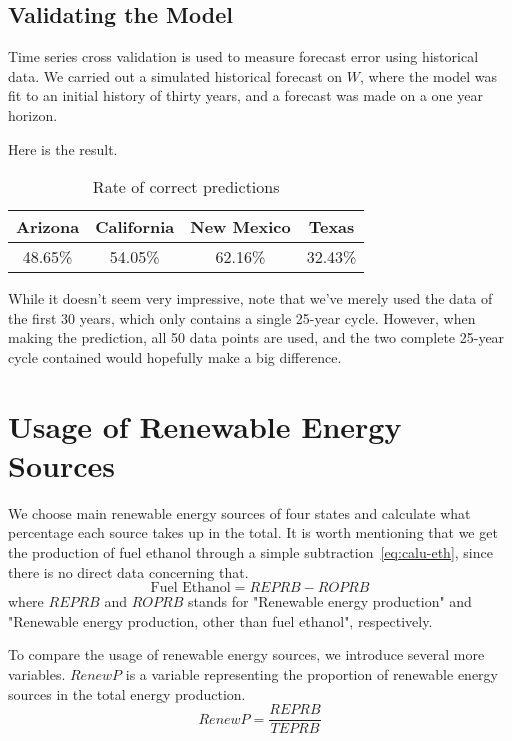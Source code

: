 \documentclass{mcmthesis}
\begin{document}
\subsection{Validating the Model}
Time series cross validation is used to measure forecast error using historical data. We carried out a simulated historical forecast on $W$, where the model was fit to an initial history of thirty years, and a forecast was made on a one year horizon.

Here is the result.
\begin{table}[h]
\centering
\begin{tabular}{cccc}
Arizona & California & New Mexico & Texas \\ \hline
48.65\% & 54.05\% & 62.16\% & 32.43\%
\end{tabular}
\caption{Rate of correct predictions}
\label{table:w-cross-validation}
\end{table}

While it doesn't seem very impressive, note that we've merely used the data of the first 30 years, which only contains a single 25-year cycle. However, when making the prediction, all 50 data points are used, and the two complete 25-year cycle contained would hopefully make a big difference.


\section{Usage of Renewable Energy Sources}
We choose main renewable energy sources of four states and calculate what percentage each source takes up in the total.
It is worth mentioning that we get the production of fuel ethanol through a simple subtraction~\eqref{eq:calu-eth}, since there is no direct data concerning that.
\begin{equation}  \label{eq:calu-eth}
\text{Fuel Ethanol} = REPRB - ROPRB
\end{equation}
where $REPRB$ and $ROPRB$ stands for "Renewable energy production" and "Renewable energy production, other than fuel ethanol", respectively.

To compare the usage of renewable energy sources, we introduce several more variables.
$RenewP$ is a variable representing the proportion of renewable energy sources in the total energy production.
\begin{equation}
RenewP = \frac{REPRB}{TEPRB}
\end{equation}
\end{document}
